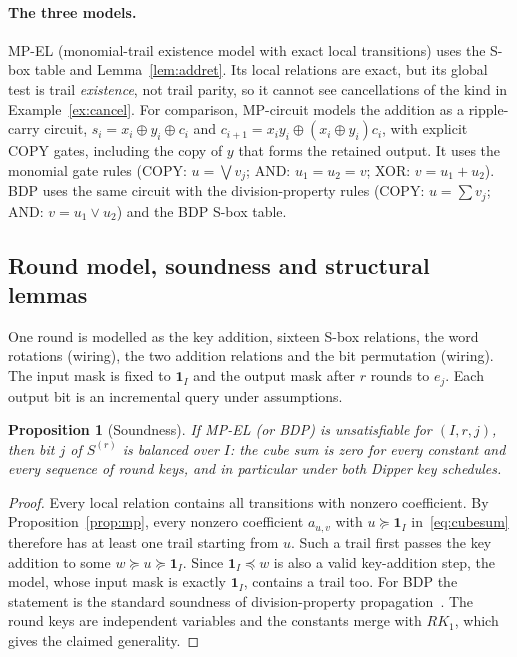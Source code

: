 \documentclass[pdflatex,sn-mathphys-num]{sn-jnl}
\theoremstyle{thmstyleone}
\newtheorem{proposition}{Proposition}
\theoremstyle{thmstylethree}
\theoremstyle{thmstyletwo}
\newcommand{\MPEL}{\textsf{MP-EL}}
\newcommand{\MPC}{\textsf{MP-circuit}}
\newcommand{\BDP}{\textsf{BDP}}
\begin{document}
\paragraph{The three models.} \MPEL{} (monomial-trail existence model with exact local transitions) uses the S-box table and Lemma~\ref{lem:addret}. Its local relations are exact, but its global test is trail \emph{existence}, not trail parity, so it cannot see cancellations of the kind in Example~\ref{ex:cancel}. For comparison, \MPC{} models the addition as a ripple-carry circuit, $s_i=x_i\oplus y_i\oplus c_i$ and $c_{i+1}=x_iy_i\oplus(x_i\oplus y_i)c_i$, with explicit COPY gates, including the copy of $y$ that forms the retained output. It uses the monomial gate rules (COPY: $u=\bigvee v_j$; AND: $u_1=u_2=v$; XOR: $v=u_1+u_2$). \BDP{} uses the same circuit with the division-property rules (COPY: $u=\sum v_j$; AND: $v=u_1\vee u_2$) and the BDP S-box table.

\subsection{Round model, soundness and structural lemmas}
One round is modelled as the key addition, sixteen S-box relations, the word rotations (wiring), the two addition relations and the bit permutation (wiring). The input mask is fixed to $\mathbf 1_I$ and the output mask after $r$ rounds to $e_j$. Each output bit is an incremental query under assumptions.

\begin{proposition}[Soundness]\label{prop:sound}
If \MPEL{} (or \BDP) is unsatisfiable for $(I,r,j)$, then bit $j$ of $S^{(r)}$ is balanced over $I$: the cube sum is zero for every constant and every sequence of round keys, and in particular under both Dipper key schedules.
\end{proposition}
\begin{proof}
Every local relation contains all transitions with nonzero coefficient. By Proposition~\ref{prop:mp}, every nonzero coefficient $a_{u,v}$ with $u\succeq\mathbf 1_I$ in~\eqref{eq:cubesum} therefore has at least one trail starting from $u$. Such a trail first passes the key addition to some $w\succeq u\succeq\mathbf 1_I$. Since $\mathbf 1_I\preceq w$ is also a valid key-addition step, the model, whose input mask is exactly $\mathbf 1_I$, contains a trail too. For \BDP{} the statement is the standard soundness of division-property propagation~\cite{todo2016bit,xiang2016milp}. The round keys are independent variables and the constants merge with $RK_1$, which gives the claimed generality.
\end{proof}
\end{document}
